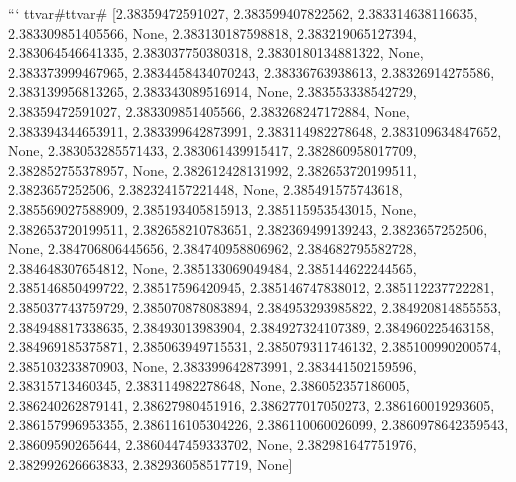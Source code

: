 \documentclass[
  11pt,
  french,
]{article}
\begin{document}
\begin{tcolorbox}[title= Répartition des volumes selon leurs caractéristiques ,colback=boitecode]
```
ttvar{#}ttvar{#} [2.38359472591027, 2.383599407822562, 2.383314638116635, 2.383309851405566, None, 2.383130187598818, 2.383219065127394, 2.383064546641335, 2.383037750380318, 2.3830180134881322, None, 2.383373999467965, 2.3834458434070243, 2.38336763938613, 2.38326914275586, 2.383139956813265, 2.383343089516914, None, 2.383553338542729, 2.38359472591027, 2.383309851405566, 2.383268247172884, None, 2.383394344653911, 2.383399642873991, 2.383114982278648, 2.383109634847652, None, 2.383053285571433, 2.383061439915417, 2.382860958017709, 2.382852755378957, None, 2.382612428131992, 2.382653720199511, 2.3823657252506, 2.382324157221448, None, 2.385491575743618, 2.385569027588909, 2.385193405815913, 2.385115953543015, None, 2.382653720199511, 2.382658210783651, 2.382369499139243, 2.3823657252506, None, 2.384706806445656, 2.384740958806962, 2.384682795582728, 2.384648307654812, None, 2.385133069049484, 2.385144622244565, 2.385146850499722, 2.38517596420945, 2.385146747838012, 2.385112237722281, 2.385037743759729, 2.385070878083894, 2.384953293985822, 2.384920814855553, 2.384948817338635, 2.38493013983904, 2.384927324107389, 2.384960225463158, 2.384969185375871, 2.385063949715531, 2.385079311746132, 2.385100990200574, 2.385103233870903, None, 2.383399642873991, 2.383441502159596, 2.38315713460345, 2.383114982278648, None, 2.386052357186005, 2.386240262879141, 2.38627980451916, 2.386277017050273, 2.386160019293605, 2.386157996953355, 2.386116105304226, 2.386110060026099, 2.3860978642359543, 2.38609590265644, 2.3860447459333702, None, 2.382981647751976, 2.382992626663833, 2.382936058517719, None]

\end{tcolorbox}
\end{document}
